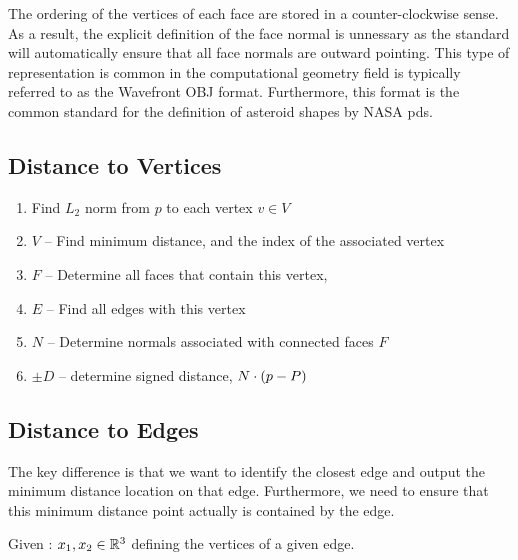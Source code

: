 The ordering of the vertices of each face are stored in a counter-clockwise sense.
As a result, the explicit definition of the face normal is unnessary as the standard will automatically ensure that all face normals are outward pointing.
This type of representation is common in the computational geometry field is typically referred to as the Wavefront OBJ format.
Furthermore, this format is the common standard for the definition of asteroid shapes by NASA \gls{pds}.
\subsection{Distance to Vertices}

\begin{enumerate}
    \item Find \( L_2\) norm from \( p \) to each vertex \( v \in V\)
    \item \( V \) -- Find minimum distance, and the index of the associated vertex
    \item \( F \) -- Determine all faces that contain this vertex, 
    \item \( E \) -- Find all edges with this vertex
    \item \( N \) -- Determine normals associated with connected faces \( F \)
    \item \( \pm D\) -- determine signed distance, \( N \cdot \left( p - P \right)\)
\end{enumerate}

\subsection{Distance to Edges}
The key difference is that we want to identify the closest edge and output the minimum distance location on that edge.
Furthermore, we need to ensure that this minimum distance point actually is contained by the edge.

Given : \( x_1, x_2 \in \mathbb{R}^3\) defining the vertices of a given edge. 

